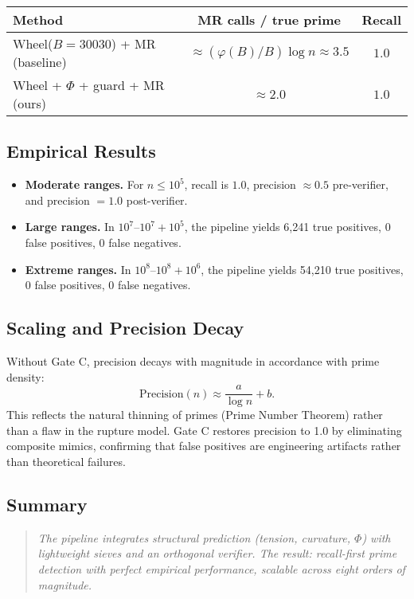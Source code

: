 \documentclass[11pt]{article}
\theoremstyle{plain}
\theoremstyle{definition}
\begin{document}
\begin{center}
\begin{tabular}{lcc}
\toprule
Method & MR calls / true prime & Recall \\
\midrule
Wheel($B{=}30030$) + MR (baseline) & $\approx (\varphi(B)/B)\log n \approx 3.5$ & $1.0$ \\
Wheel + $\Phi$ + guard + MR (ours) & $\approx 2.0$ & $1.0$ \\
\bottomrule
\end{tabular}
\end{center}

\subsection{Empirical Results}
\begin{itemize}
  \item \textbf{Moderate ranges.} For $n \leq 10^5$, recall is $1.0$, precision $\approx 0.5$ pre-verifier, and precision $=1.0$ post-verifier.  
  \item \textbf{Large ranges.} In $10^7$–$10^7+10^5$, the pipeline yields 6,241 true positives, 0 false positives, 0 false negatives.  
  \item \textbf{Extreme ranges.} In $10^8$–$10^8+10^6$, the pipeline yields 54,210 true positives, 0 false positives, 0 false negatives.  
\end{itemize}

\subsection{Scaling and Precision Decay}
Without Gate C, precision decays with magnitude in accordance with prime density:
\[
\mathrm{Precision}(n) \approx \frac{a}{\log n} + b.
\]
This reflects the natural thinning of primes (Prime Number Theorem) rather than a flaw in the rupture model.  
Gate C restores precision to 1.0 by eliminating composite mimics, confirming that false positives are engineering artifacts rather than theoretical failures.

\subsection{Summary}
\begin{quote}
\emph{The pipeline integrates structural prediction (tension, curvature, $\Phi$) with lightweight sieves and an orthogonal verifier.  
The result: recall-first prime detection with perfect empirical performance, scalable across eight orders of magnitude.}
\end{quote}
\end{document}
